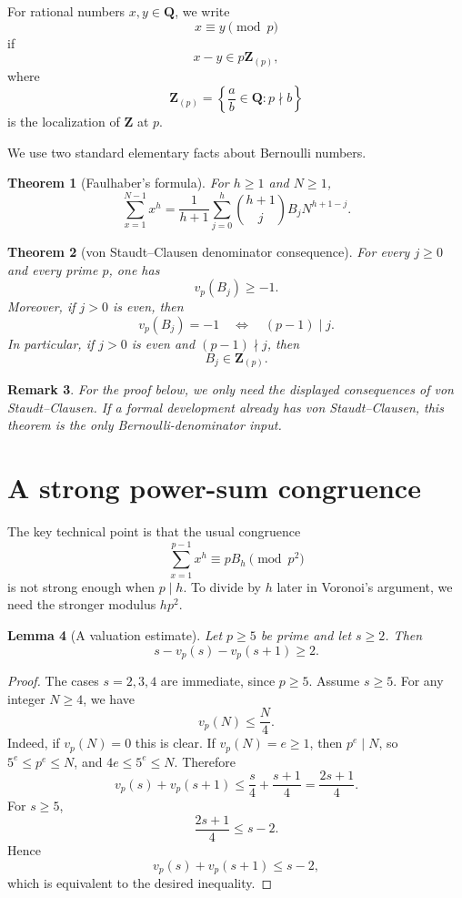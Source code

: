 \documentclass[11pt]{article}
\newtheorem{theorem}{Theorem}[section]
\newtheorem{lemma}[theorem]{Lemma}
\newtheorem{remark}[theorem]{Remark}
\newcommand{\Z}{\mathbf Z}
\newcommand{\Q}{\mathbf Q}
\newcommand{\Bern}{B}
\begin{document}
For rational numbers $x,y\in\Q$, we write
\[
  x\equiv y\pmod p
\]
if
\[
  x-y\in p\Z_{(p)},
\]
where
\[
  \Z_{(p)}=\left\{\frac ab\in\Q: p\nmid b\right\}
\]
is the localization of $\Z$ at $p$.

We use two standard elementary facts about Bernoulli numbers.

\begin{theorem}[Faulhaber's formula]\label{thm:faulhaber}
For $h\ge 1$ and $N\ge 1$,
\[
  \sum_{x=1}^{N-1}x^h
  =
  \frac{1}{h+1}
  \sum_{j=0}^{h}
  {h+1\choose j}\Bern_j N^{h+1-j}.
\]
\end{theorem}

\begin{theorem}[von Staudt--Clausen denominator consequence]\label{thm:vsc}
For every $j\ge 0$ and every prime $p$, one has
\[
  v_p(\Bern_j)\ge -1.
\]
Moreover, if $j>0$ is even, then
\[
  v_p(\Bern_j)=-1
  \quad\Longleftrightarrow\quad
  (p-1)\mid j.
\]
In particular, if $j>0$ is even and $(p-1)\nmid j$, then
\[
  \Bern_j\in \Z_{(p)}.
\]
\end{theorem}

\begin{remark}
For the proof below, we only need the displayed consequences of
von Staudt--Clausen.  If a formal development already has
von Staudt--Clausen, this theorem is the only Bernoulli-denominator input.
\end{remark}

\section{A strong power-sum congruence}

The key technical point is that the usual congruence
\[
  \sum_{x=1}^{p-1}x^h\equiv p\Bern_h\pmod {p^2}
\]
is not strong enough when $p\mid h$.  To divide by $h$ later in Voronoi's
argument, we need the stronger modulus $h p^2$.

\begin{lemma}[A valuation estimate]\label{lem:valuation-estimate}
Let $p\ge 5$ be prime and let $s\ge 2$.  Then
\[
  s-v_p(s)-v_p(s+1)\ge 2.
\]
\end{lemma}

\begin{proof}
The cases $s=2,3,4$ are immediate, since $p\ge5$.
Assume $s\ge5$.  For any integer $N\ge4$, we have
\[
  v_p(N)\le \frac{N}{4}.
\]
Indeed, if $v_p(N)=0$ this is clear.  If $v_p(N)=e\ge1$, then
$p^e\mid N$, so $5^e\le p^e\le N$, and $4e\le 5^e\le N$.
Therefore
\[
  v_p(s)+v_p(s+1)
  \le \frac{s}{4}+\frac{s+1}{4}
  =\frac{2s+1}{4}.
\]
For $s\ge5$,
\[
  \frac{2s+1}{4}\le s-2.
\]
Hence
\[
  v_p(s)+v_p(s+1)\le s-2,
\]
which is equivalent to the desired inequality.
\end{proof}
\end{document}
